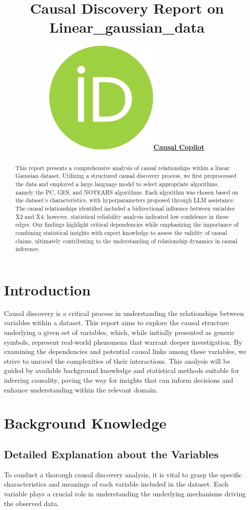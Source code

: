 \documentclass{article}
\title{Causal Discovery Report on Linear\_gaussian\_data}
\author{ \href{https://orcid.org/0000-0000-0000-0000}{\includegraphics[scale=0.06]{postprocess/context/orcid.pdf}\hspace{1mm}\textbf{Causal Copilot}}}
\begin{document}
\maketitle

\begin{abstract}
This report presents a comprehensive analysis of causal relationships within a linear Gaussian dataset. Utilizing a structured causal discovery process, we first preprocessed the data and employed a large language model to select appropriate algorithms, namely the PC, GES, and NOTEARS algorithms. Each algorithm was chosen based on the dataset's characteristics, with hyperparameters proposed through LLM assistance. The causal relationships identified included a bidirectional influence between variables X2 and X4; however, statistical reliability analysis indicated low confidence in these edges. Our findings highlight critical dependencies while emphasizing the importance of combining statistical insights with expert knowledge to assess the validity of causal claims, ultimately contributing to the understanding of relationship dynamics in causal inference.
\end{abstract}


\raggedbottom
\section{Introduction}
Causal discovery is a critical process in understanding the relationships between variables within a dataset. This report aims to explore the causal structure underlying a given set of variables, which, while initially presented as generic symbols, represent real-world phenomena that warrant deeper investigation. By examining the dependencies and potential causal links among these variables, we strive to unravel the complexities of their interactions. This analysis will be guided by available background knowledge and statistical methods suitable for inferring causality, paving the way for insights that can inform decisions and enhance understanding within the relevant domain.

\section{Background Knowledge}
\subsection{Detailed Explanation about the Variables}
To conduct a thorough causal discovery analysis, it is vital to grasp the specific characteristics and meanings of each variable included in the dataset. Each variable plays a crucial role in understanding the underlying mechanisms driving the observed data.
\end{document}
